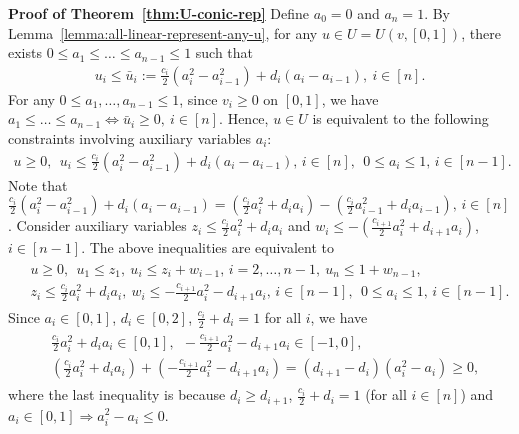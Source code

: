 	\smallskip\noindent\textbf{Proof of Theorem~\ref{thm:U-conic-rep}}
		Define $a_0 = 0$ and $a_n = 1$. By Lemma~\ref{lemma:all-linear-represent-any-u}, for any $u\in U = U(v, [0,1])$, there exists $0\leq a_1 \leq \dots \leq a_{n-1}\leq 1$ such that 
	\begin{align}
		u_i \leq \bar{u}_i := \frac{c_i}{2}(a_i^2 - a_{i-1}^2) + d_i (a_i - a_{i-1}),\ i\in [n]. 
		\label{eq:u<=a}
	\end{align}
	For any $0\leq a_1, \dots, a_{n-1}\leq 1$, since $v_i \geq 0$ on $[0,1]$, we have 
	$ a_1 \leq \dots \leq a_{n-1} \Leftrightarrow \bar{u}_i \geq 0, \ i\in [n]$.
	Hence, $u\in U$ is equivalent to the following constraints involving auxiliary variables $a_i$:
	\begin{align*}
		u\geq 0, \ \
		u_i \leq \frac{c_i}{2}(a_i^2 - a_{i-1}^2) + d_i (a_i - a_{i-1}),\, i\in [n],\ \
		 0 \leq a_i \leq 1,\, i\in [n-1]. 
	\end{align*}
	Note that $\frac{c_i}{2}(a_i^2 - a_{i-1}^2) + d_i(a_i - a_{i-1}) = \left(\frac{c_i}{2}a_i^2 + d_i a_i\right) - \left(\frac{c_i}{2}a_{i-1}^2 + d_i a_{i-1}\right),\, i\in [n]$.
	Consider auxiliary variables $z_i\leq \frac{c_i}{2}a_i^2 + d_i a_i$ and $w_i \leq - (\frac{c_{i+1}}{2}a_i^2 + d_{i+1} a_i)$, $i\in [n-1]$. The above inequalities are equivalent to 
	\begin{align}
		\begin{split}
			& u\geq 0, \ \ u_1 \leq z_1, \  u_i \leq z_i + w_{i-1},\, i=2, \dots, n-1, \  u_n \leq 1+w_{n-1},\\
			& z_i \leq \frac{c_i}{2} a_i^2 + d_i a_i,\ w_i \leq -\frac{c_{i+1}}{2} a_i^2 - d_{i+1}a_i, \, i \in [n-1], \ \ 0\leq a_i \leq 1,\, i\in [n-1]. 
		\end{split}\label{eq:rep-U-u,z,w,a}
	\end{align}
	Since $a_i \in [0,1]$, $d_i \in [0,2]$, $\frac{c_i}{2} + d_i = 1$ for all $i$, we have
	\begin{align}
		\begin{split}
			& \frac{c_i}{2}a_i^2 + d_i a_i \in [0,1],\ \ -\frac{c_{i+1}}{2}a_i^2 - d_{i+1} a_i \in [-1,0],\\
			& \left(\frac{c_i}{2}a_i^2 + d_i a_i \right) + \left(-\frac{c_{i+1}}{2}a_i^2 - d_{i+1} a_i\right) = (d_{i+1} - d_i)(a_i^2 - a_i) \geq 0, 
		\end{split} \label{eq:range-quad-expr-a}
	\end{align}
	where the last inequality is because $d_i \geq d_{i+1}$, $\frac{c_i}{2} + d_i = 1$ (for all $i\in [n]$) and $a_i \in [0,1] \Rightarrow a_i^2 - a_i \leq 0$.

